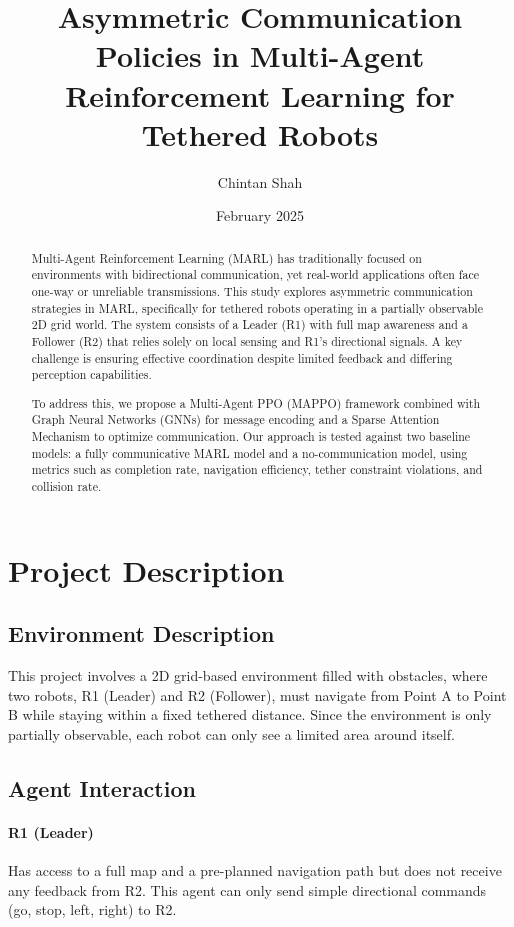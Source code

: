\documentclass[a4paper,11pt]{article}
\title{Asymmetric Communication Policies in Multi-Agent Reinforcement Learning for Tethered Robots}
\author{
  Chintan Shah
}
\date{February 2025}
\begin{document}
\maketitle
\clearpage
\begin{abstract}
Multi-Agent Reinforcement Learning (MARL) has traditionally focused on environments with bidirectional communication, yet real-world applications often face one-way or unreliable transmissions. This study explores asymmetric communication strategies in MARL, specifically for tethered robots operating in a partially observable 2D grid world. The system consists of a Leader (R1) with full map awareness and a Follower (R2) that relies solely on local sensing and R1’s directional signals. A key challenge is ensuring effective coordination despite limited feedback and differing perception capabilities.

To address this, we propose a Multi-Agent PPO (MAPPO) framework combined with Graph Neural Networks (GNNs) for message encoding and a Sparse Attention Mechanism to optimize communication. Our approach is tested against two baseline models: a fully communicative MARL model and a no-communication model, using metrics such as completion rate, navigation efficiency, tether constraint violations, and collision rate.
\end{abstract}

\section{Project Description}

\subsection{Environment Description}

This project involves a 2D grid-based environment filled with obstacles, where two robots, R1 (Leader) and R2 (Follower), must navigate from Point A to Point B while staying within a fixed tethered distance. Since the environment is only partially observable, each robot can only see a limited area around itself.

\subsection{Agent Interaction}

\paragraph{R1 (Leader)} Has access to a full map and a pre-planned navigation path but does not receive any feedback from R2. This agent can only send simple directional commands (go, stop, left, right) to R2.
\end{document}
